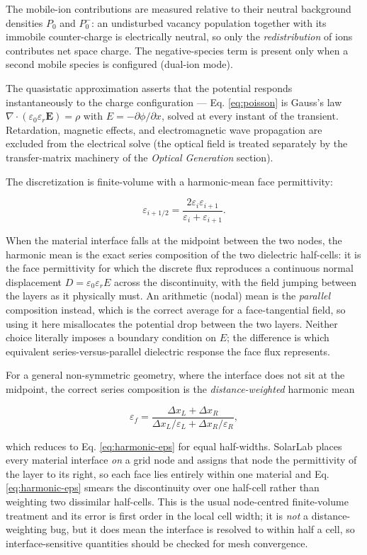 \documentclass[
  11pt,
  american,
]{report}
\begin{document}
The mobile-ion contributions are measured relative to their neutral
background densities \(P_0\) and \(P^-_0\): an undisturbed vacancy
population together with its immobile counter-charge is electrically
neutral, so only the \emph{redistribution} of ions contributes net space
charge. The negative-species term is present only when a second mobile
species is configured (dual-ion mode).

The quasistatic approximation asserts that the potential responds
instantaneously to the charge configuration --- Eq. \ref{eq:poisson} is
Gauss's law
\(\nabla\cdot(\varepsilon_0\varepsilon_r \mathbf{E}) = \rho\) with
\(E = -\partial\phi/\partial x\), solved at every instant of the
transient. Retardation, magnetic effects, and electromagnetic wave
propagation are excluded from the electrical solve (the optical field is
treated separately by the transfer-matrix machinery of the \emph{Optical
Generation} section).

The discretization is finite-volume with a harmonic-mean face
permittivity:

\begin{equation}
\label{eq:harmonic-eps}
\varepsilon_{i+1/2}
=
\frac{2\varepsilon_i\varepsilon_{i+1}}
{\varepsilon_i+\varepsilon_{i+1}} .
\end{equation}

When the material interface falls at the midpoint between the two nodes,
the harmonic mean is the exact series composition of the two dielectric
half-cells: it is the face permittivity for which the discrete flux
reproduces a continuous normal displacement
\(D = \varepsilon_0\varepsilon_r E\) across the discontinuity, with the
field jumping between the layers as it physically must. An arithmetic
(nodal) mean is the \emph{parallel} composition instead, which is the
correct average for a face-tangential field, so using it here
misallocates the potential drop between the two layers. Neither choice
literally imposes a boundary condition on \(E\); the difference is which
equivalent series-versus-parallel dielectric response the face flux
represents.

For a general non-symmetric geometry, where the interface does not sit
at the midpoint, the correct series composition is the
\emph{distance-weighted} harmonic mean

\[
\varepsilon_f=
\frac{\Delta x_L+\Delta x_R}
{\Delta x_L/\varepsilon_L+\Delta x_R/\varepsilon_R},
\]

which reduces to Eq. \ref{eq:harmonic-eps} for equal half-widths.
SolarLab places every material interface \emph{on} a grid node and
assigns that node the permittivity of the layer to its right, so each
face lies entirely within one material and Eq. \ref{eq:harmonic-eps}
smears the discontinuity over one half-cell rather than weighting two
dissimilar half-cells. This is the usual node-centred finite-volume
treatment and its error is first order in the local cell width; it is
\emph{not} a distance-weighting bug, but it does mean the interface is
resolved to within half a cell, so interface-sensitive quantities should
be checked for mesh convergence.
\end{document}

